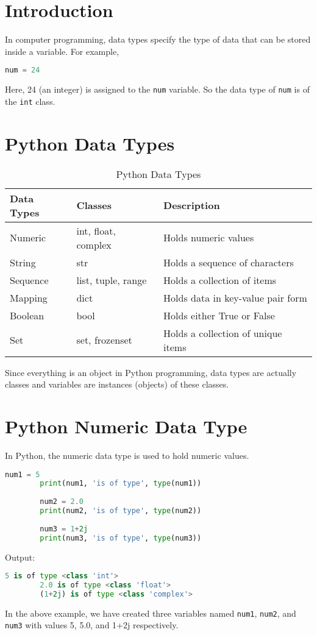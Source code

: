 \documentclass{article}
\begin{document}
	
	\section{Introduction}
	In computer programming, data types specify the type of data that can be stored inside a variable. For example,
	\begin{lstlisting}[language=Python]
		num = 24
	\end{lstlisting}
	Here, 24 (an integer) is assigned to the \texttt{num} variable. So the data type of \texttt{num} is of the \texttt{int} class.
	
	\section{Python Data Types}
	\begin{table}[htbp]
		\centering
		\begin{tabular}{|l|l|p{6cm}|}
			\hline
			\textbf{Data Types} & \textbf{Classes} & \textbf{Description} \\ \hline
			Numeric & int, float, complex & Holds numeric values \\ \hline
			String & str & Holds a sequence of characters \\ \hline
			Sequence & list, tuple, range & Holds a collection of items \\ \hline
			Mapping & dict & Holds data in key-value pair form \\ \hline
			Boolean & bool & Holds either True or False \\ \hline
			Set & set, frozenset & Holds a collection of unique items \\ \hline
		\end{tabular}
		\caption{Python Data Types}
		\label{tab:datatypes}
	\end{table}
	
	Since everything is an object in Python programming, data types are actually classes and variables are instances (objects) of these classes.
	
	\section{Python Numeric Data Type}
	In Python, the numeric data type is used to hold numeric values.
	\begin{lstlisting}[language=Python]
		num1 = 5
		print(num1, 'is of type', type(num1))
		
		num2 = 2.0
		print(num2, 'is of type', type(num2))
		
		num3 = 1+2j
		print(num3, 'is of type', type(num3))
	\end{lstlisting}
	Output:
	\begin{lstlisting}[language=Python]
		5 is of type <class 'int'>
		2.0 is of type <class 'float'>
		(1+2j) is of type <class 'complex'>
	\end{lstlisting}
	In the above example, we have created three variables named \texttt{num1}, \texttt{num2}, and \texttt{num3} with values 5, 5.0, and 1+2j respectively.
	
\end{document}
